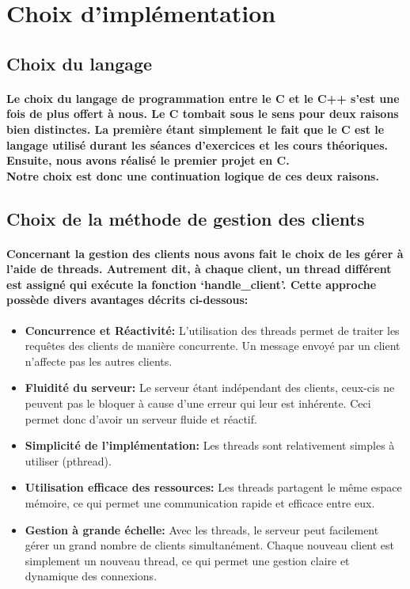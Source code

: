 \documentclass[utf8]{article}
\begin{document}
\section{Choix d’implémentation}
\subsection{Choix du langage}
\paragraph{Le choix du langage de programmation entre le C et le C++ s'est une fois de plus offert à nous. Le C tombait sous le sens pour deux raisons bien distinctes. 
La première étant simplement le fait que le C est le langage utilisé durant les séances d'exercices et les cours théoriques. Ensuite, nous avons réalisé le premier projet en C. \\
Notre choix est donc une continuation logique de ces deux raisons.}

\subsection{Choix de la méthode de gestion des clients}
\paragraph{Concernant la gestion des clients nous avons fait le choix de les gérer à l'aide de threads. Autrement dit, à chaque client, un thread différent est assigné qui exécute
la fonction `handle\_client'. Cette approche possède divers avantages décrits ci-dessous:}
\begin{itemize}
    \item \textbf{Concurrence et Réactivité:} L'utilisation des threads permet de traiter les requêtes des clients de manière concurrente. Un message envoyé par un client n'affecte pas les autres clients.
    \item \textbf{Fluidité du serveur:} Le serveur étant indépendant des clients, ceux-cis ne peuvent pas le bloquer à cause d'une erreur qui leur est inhérente. Ceci permet donc d'avoir un serveur fluide et réactif.
    \item \textbf{Simplicité de l'implémentation:} Les threads sont relativement simples à utiliser (pthread).
    \item \textbf{Utilisation efficace des ressources:} Les threads partagent le même espace mémoire, ce qui permet une communication rapide et efficace entre eux.
    \item \textbf{Gestion à grande échelle:} Avec les threads, le serveur peut facilement gérer un grand nombre de clients simultanément. Chaque nouveau client est simplement un nouveau thread, 
    ce qui permet une gestion claire et dynamique des connexions.
\end{itemize}
\end{document}
